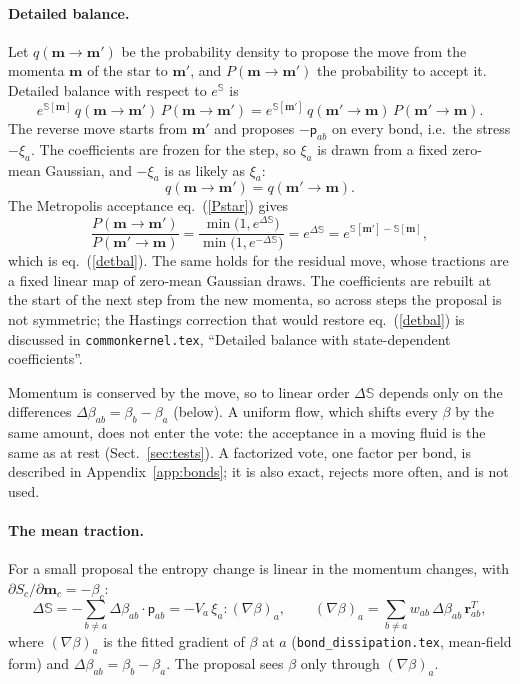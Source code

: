 \documentclass[11pt,aps,preprint,nofootinbib,superscriptaddress,tightenlines]{revtex4-2}
\def\st{\begin{equation}}
\def\stp{\end{equation}}
\def\Eq#1{eq.~(\ref{#1})}
\def\Sect#1{Sect.~\ref{#1}}
\def\App#1{Appendix~\ref{#1}}
\newcommand{\pf}{\bm{\mathsf p}}
\let\oldparagraph\paragraph
\renewcommand{\paragraph}{\par\bigskip\oldparagraph}
\begin{document}
\paragraph{Detailed balance.}  Let $q(\bm m\to\bm m')$ be the probability density to propose the move from the
momenta $\bm m$ of the star to $\bm m'$, and $P(\bm m\to\bm m')$ the probability to accept it.  Detailed balance with
respect to $e^{\mathbb S}$ is
\st
e^{\mathbb S[\bm m]}\,q(\bm m\to\bm m')\,P(\bm m\to\bm m')=e^{\mathbb S[\bm m']}\,q(\bm m'\to\bm m)\,P(\bm m'\to\bm m) .
\label{detbal}
\stp
The reverse move starts from $\bm m'$ and proposes $-\pf_{ab}$ on every bond, i.e.\ the stress $-\xi_a$.  The
coefficients are frozen for the step, so $\xi_a$ is drawn from a fixed zero-mean Gaussian, and $-\xi_a$ is
as likely as $\xi_a$:
\st
q(\bm m\to\bm m')=q(\bm m'\to\bm m) .
\stp
The Metropolis acceptance \Eq{Pstar} gives
\st
\frac{P(\bm m\to\bm m')}{P(\bm m'\to\bm m)}=\frac{\min\big(1,e^{\Delta\mathbb S}\big)}{\min\big(1,e^{-\Delta\mathbb S}\big)}=e^{\Delta\mathbb S}
=e^{\mathbb S[\bm m']-\mathbb S[\bm m]} ,
\stp
which is \Eq{detbal}.  The same holds for the residual move, whose tractions are a fixed linear map of
zero-mean Gaussian draws.  The coefficients are rebuilt at the start of the next step from the new momenta,
so across steps the proposal is not symmetric; the Hastings correction that would restore \Eq{detbal}
is discussed in \texttt{commonkernel.tex}, ``Detailed balance with state-dependent coefficients''.

Momentum is conserved by the move, so to linear order $\Delta\mathbb S$ depends only
on the differences $\Delta\beta_{ab}=\beta_b-\beta_a$ (below).  A uniform flow, which
shifts every $\beta$ by the same amount, does not enter the vote: the acceptance
in a moving fluid is the same as at rest (\Sect{sec:tests}).  A factorized vote,
one factor per bond, is described in \App{app:bonds}; it is also exact, rejects
more often, and is not used.

\paragraph{The mean traction.}  For a small proposal the entropy change is
linear in the momentum changes, with $\partial S_c/\partial\bm m_c=-\beta_c$:
\st
\Delta\mathbb S=-\sum_{b\neq a}\Delta\beta_{ab}\cdot\pf_{ab}
=-V_a\,\xi_a{:}(\nabla\beta)_a,\qquad
(\nabla\beta)_a=\sum_{b\neq a}w_{ab}\,\Delta\beta_{ab}\,\bm r_{ab}^T ,
\stp
where $(\nabla\beta)_a$ is the fitted gradient of $\beta$ at $a$
(\texttt{bond\_dissipation.tex}, mean-field form) and $\Delta\beta_{ab}=\beta_b-\beta_a$.  The proposal sees $\beta$ only
through $(\nabla\beta)_a$.
\end{document}
